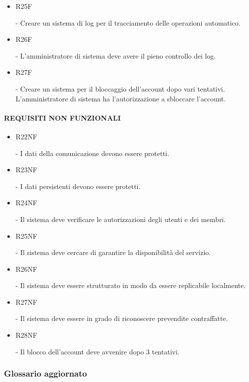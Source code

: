 \documentclass[a4paper]{article}
\begin{document}
\begin{itemize}
    \item \hypertarget{R25F}{R25F} - Creare un sistema di log per il tracciamento delle operazioni automatico.
    \item \hypertarget{R26F}{R26F} - L'amministratore di sistema deve avere il pieno controllo dei log.
    \item \hypertarget{R27F}{R27F} - Creare un sistema per il bloccaggio dell'account dopo vari tentativi. L'amministratore di sistema ha l'autorizzazione a sbloccare l'account.
\end{itemize}

\paragraph{REQUISITI NON FUNZIONALI}

\begin{itemize}
    \item \hypertarget{R22NF}{R22NF} - I dati della comunicazione devono essere protetti.
    \item \hypertarget{R23NF}{R23NF} - I dati persistenti devono essere protetti.
    \item \hypertarget{R24NF}{R24NF} - Il sistema deve verificare le autorizzazioni degli utenti e dei membri.
    \item \hypertarget{R25NF}{R25NF} - Il sistema deve cercare di garantire la disponibilità del servizio.
    \item \hypertarget{R26NF}{R26NF} - Il sistema deve essere strutturato in modo da essere replicabile localmente.
    \item \hypertarget{R27NF}{R27NF} - Il sistema deve essere in grado di riconoscere prevendite contraffatte.
    \item \hypertarget{R28NF}{R28NF} - Il blocco dell'account deve avvenire dopo 3 tentativi.
\end{itemize}


\subsubsection{Glossario aggiornato}
\end{document}
